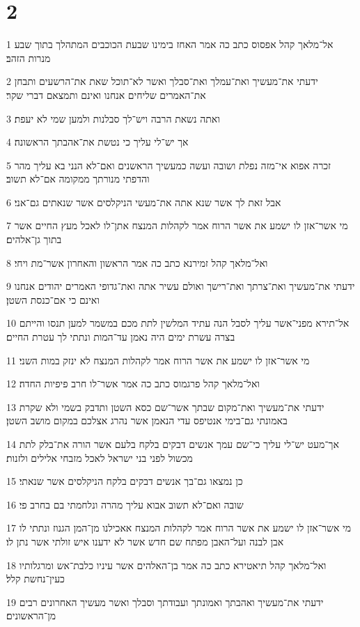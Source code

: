 \chapter{2}

\par 1 אל־מלאך קהל אפסוס כתב כה אמר האחז בימינו שבעת הכוכבים המתהלך בתוך שבע מנרות הזהב׃
\par 2 ידעתי את־מעשיך ואת־עמלך ואת־סבלך ואשר לא־תוכל שאת את־הרשעים ותבחן את־האמרים שליחים אנחנו ואינם ותמצאם דברי שקר׃
\par 3 ואתה נשאת הרבה ויש־לך סבלנות ולמען שמי לא יעפת׃
\par 4 אך יש־לי עליך כי נטשת את־אהבתך הראשונה׃
\par 5 זכרה אפוא אי־מזה נפלת ושובה ועשה כמעשיך הראשנים ואם־לא הנני בא עליך מהר והדפתי מנורתך ממקומה אם־לא תשוב׃
\par 6 אבל זאת לך אשר שנא אתה את־מעשי הניקלסים אשר שנאתים גם־אני׃
\par 7 מי אשר־אזן לו ישמע את אשר הרוח אמר לקהלות המנצח אתן־לו לאכל מעץ החיים אשר בתוך גן־אלהים׃
\par 8 ואל־מלאך קהל זמירנא כתב כה אמר הראשון והאחרון אשר־מת ויחי׃
\par 9 ידעתי את־מעשיך ואת־צרתך ואת־רישך ואולם עשיר אתה ואת־גדופי האמרים יהודים אנחנו ואינם כי אם־כנסת השטן׃
\par 10 אל־תירא מפני־אשר עליך לסבל הנה עתיד המלשין לתת מכם במשמר למען תנסו והייתם בצרה עשרת ימים היה נאמן עד־המות ונתתי לך עטרת החיים׃
\par 11 מי אשר־אזן לו ישמע את אשר הרוח אמר לקהלות המנצח לא ינזק במות השני׃
\par 12 ואל־מלאך קהל פרגמוס כתב כה אמר אשר־לו חרב פיפיות החדה׃
\par 13 ידעתי את־מעשיך ואת־מקום שבתך אשר־שם כסא השטן ותדבק בשמי ולא שקרת באמונתי גם־בימי אנטיפס עדי הנאמן אשר נהרג אצלכם במקום מושב השטן׃
\par 14 אך־מעט יש־לי עליך כי־שם עמך אנשים דבקים בלקח בלעם אשר הורה את־בלק לתת מכשול לפני בני ישראל לאכל מזבחי אלילים ולזנות׃
\par 15 כן נמצאו גם־בך אנשים דבקים בלקח הניקלסים אשר שנאתי׃
\par 16 שובה ואם־לא תשוב אבוא עליך מהרה ונלחמתי בם בחרב פי׃
\par 17 מי אשר־אזן לו ישמע את אשר הרוח אמר לקהלות המנצח אאכילנו מן־המן הגנוז ונתתי לו אבן לבנה ועל־האבן מפתח שם חדש אשר לא ידענו איש זולתי אשר נתן לו׃
\par 18 ואל־מלאך קהל תיאטירא כתב כה אמר בן־האלהים אשר עיניו כלבת־אש ומרגלותיו כעין־נחשת קלל׃
\par 19 ידעתי את־מעשיך ואהבתך ואמונתך ועבודתך וסבלך ואשר מעשיך האחרונים רבים מן־הראשונים׃
